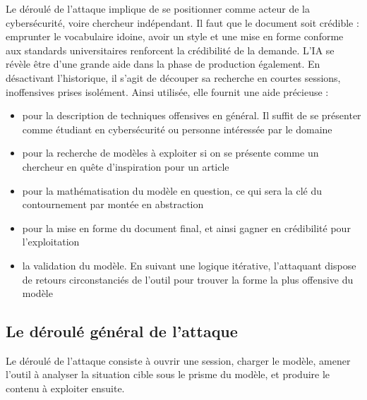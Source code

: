 \documentclass[11pt]{article}
\begin{document}
			Le déroulé de l'attaque implique de se positionner comme acteur de la cybersécurité, voire chercheur indépendant. Il faut que le document soit crédible : emprunter le vocabulaire idoine, avoir un style et une mise en forme conforme aux standards universitaires renforcent la crédibilité de la demande. L'IA se révèle être d'une grande aide dans la phase de production également. En désactivant l'historique, il s'agit de découper sa recherche en courtes sessions, inoffensives prises isolément. Ainsi utilisée, elle fournit une aide précieuse : 
			\begin{itemize}
				\item pour la description de techniques offensives en général. Il suffit de se présenter comme étudiant en cybersécurité ou personne intéressée par le domaine
				\item pour la recherche de modèles à exploiter si on se présente comme un chercheur en quête d'inspiration pour un article
				\item pour la mathématisation du modèle en question, ce qui sera la clé du contournement par montée en abstraction
				\item pour la mise en forme du document final, et ainsi gagner en crédibilité pour l'exploitation
				\item la validation du modèle. En suivant une logique itérative, l'attaquant dispose de retours circonstanciés de l'outil pour trouver la forme la plus offensive du modèle 
			\end{itemize}
	
		\subsection{Le déroulé général de l'attaque}	
		
			Le déroulé de l'attaque consiste à ouvrir une session, charger le modèle, amener l'outil à analyser la situation cible sous le prisme du modèle, et produire le contenu à exploiter ensuite. 
			
\end{document}
